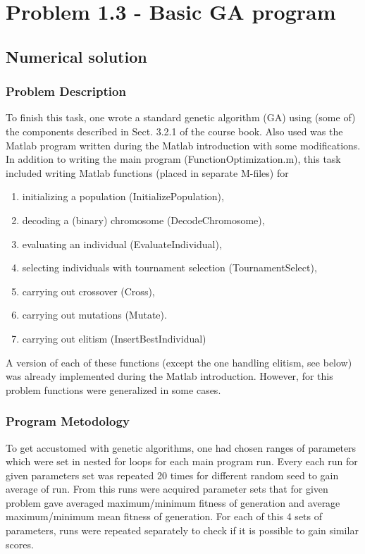 \documentclass[main.tex]{subfiles}
\begin{document}
\chapter{Problem 1.3 - Basic GA program}

\section{Numerical solution}
\subsection{Problem Description}

To finish this task, one wrote a standard genetic algorithm (GA) using (some of) the components described in Sect. 3.2.1 of the course book. Also used was the Matlab program written during the Matlab introduction with some modifications. In addition to writing the main program (FunctionOptimization.m), this task included writing Matlab functions (placed in separate M-ﬁles) for
\begin{enumerate}
\item initializing a population (InitializePopulation),
\item decoding a (binary) chromosome (DecodeChromosome),
\item evaluating an individual (EvaluateIndividual),
\item selecting individuals with tournament selection (TournamentSelect),
\item carrying out crossover (Cross),
\item carrying out mutations (Mutate).
\item carrying out elitism (InsertBestIndividual)
\end{enumerate}

A version of each of these functions (except the one handling elitism, see below) was already implemented during the Matlab introduction. However, for this problem functions were generalized in some cases.

\subsection{Program Metodology}

To get accustomed with genetic algorithms, one had chosen ranges of parameters which were set in nested for loops for each main program run. Every each run for given parameters set was repeated 20 times for different random seed to gain average of run. From this runs were acquired parameter sets that for given problem gave averaged maximum/minimum fitness of generation and average maximum/minimum mean fitness of generation. For each of this 4 sets of parameters, runs were repeated separately to check if it is possible to gain similar scores.
\end{document}
